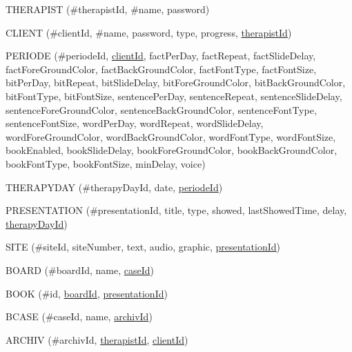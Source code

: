 \begin{list}{}
	\item THERAPIST (\#therapistId, \#name, password)
	\item CLIENT (\#clientId, \#name, password, type, progress, \underline{therapistId})
	\item PERIODE (\#periodeId, \underline{clientId}, factPerDay, factRepeat, factSlideDelay, factForeGroundColor, factBackGroundColor, factFontType, factFontSize, bitPerDay, bitRepeat, bitSlideDelay, bitForeGroundColor, bitBackGroundColor, bitFontType, bitFontSize, sentencePerDay, sentenceRepeat, sentenceSlideDelay, sentenceForeGroundColor, sentenceBackGroundColor, sentenceFontType, sentenceFontSize, wordPerDay, wordRepeat, wordSlideDelay, wordForeGroundColor, wordBackGroundColor, wordFontType, wordFontSize,  bookEnabled, bookSlideDelay, bookForeGroundColor, bookBackGroundColor, bookFontType, bookFontSize, minDelay, voice)
	\item THERAPYDAY (\#therapyDayId, date, \underline{periodeId})
	\item PRESENTATION (\#presentationId, title, type, showed, lastShowedTime, delay, \underline{therapyDayId})
	\item SITE (\#siteId, siteNumber, text, audio, graphic, \underline{presentationId})
	\item BOARD (\#boardId, name, \underline{caseId})
	\item BOOK (\#id, \underline{boardId}, \underline{presentationId})
	\item BCASE (\#caseId, name, \underline{archivId})
	\item ARCHIV (\#archivId, \underline{therapistId}, \underline{clientId})
\end{list}

